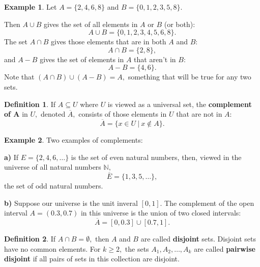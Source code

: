 \documentclass[
]{book}
\theoremstyle{definition}
\newtheorem{definition}{Definition}[chapter]
\theoremstyle{definition}
\newtheorem{example}{Example}[chapter]
\theoremstyle{definition}
\theoremstyle{definition}
\theoremstyle{remark}
\begin{document}
\begin{example}
\protect\hypertarget{exm:set-arithmetic}{}\label{exm:set-arithmetic}Let \(A = \{2,4,6,8\}\) and \(B = \{ 0,1,2,3,5,8\}.\)

Then \(A \cup B\) gives the set of all elements in \(A\) or \(B\) (or both): \[A \cup B = \{0,1,2,3,4,5,6,8 \}.\] The set \(A\cap B\) gives those elements that are in both \(A\) and \(B\): \[A \cap B = \{2,8 \},\]
and \(A - B\) gives the set of elements in \(A\) that aren't in \(B\):
\[A - B = \{4,6\}.\]
Note that \((A \cap B) \cup (A - B) = A,\) something that will be true for any two sets.
\end{example}

\begin{definition}
\protect\hypertarget{def:complement}{}\label{def:complement}If \(A \subseteq U\) where \(U\) is viewed as a universal set, the \textbf{complement of A} in \(U,\) denoted \(\overline{A},\) consists of those elements in \(U\) that are not in \(A\): \[\overline{A}=\{x \in U ~|~ x \notin A\}.\]
\end{definition}

\begin{example}
\protect\hypertarget{exm:complement}{}\label{exm:complement}Two examples of complements:

\textbf{a)} If \(E = \{2, 4, 6, \ldots \}\) is the set of even natural numbers, then, viewed in the universe of all natural numbers \(\mathbb{N},\) \[\overline{E} = \{1, 3, 5, \ldots \},\] the set of odd natural numbers.

\textbf{b)} Suppose our universe is the unit inveral \([0,1]\). The complement of the open interval \(A = (0.3,0.7)\) in this universe is the union of two closed intervals: \[\overline{A} = [0,0.3] \cup [0.7,1].\]
\end{example}

\begin{definition}
\protect\hypertarget{def:disjoint-sets}{}\label{def:disjoint-sets}If \(A \cap B = \emptyset,\) then \(A\) and \(B\) are called \textbf{disjoint} sets. Disjoint sets have no common elements. For \(k \geq 2,\) the sets \(A_1, A_2, \ldots, A_k\) are called \textbf{pairwise disjoint} if all pairs of sets in this collection are disjoint.
\end{definition}
\end{document}
